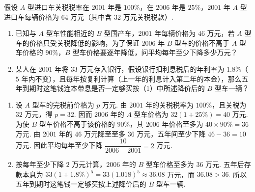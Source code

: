 \begin{problem}
假设 \(A\) 型进口车关税税率在 \(2001\text{ 年}\)是 \(100\%\)，在 \(2006\text{ 年}\)是 \(25\%\)，\(2001\text{ 年}\) \(A\) 型进口车每辆价格为 \(64\text{ 万元}\)（其中含 \(32\text{ 万元}\)关税税款）.
\begin{enumerate}
\item 已知与 \(A\) 型车性能相近的 \(B\) 型国产车，\(2001\text{ 年}\)每辆价格为 \(46\text{ 万元}\)，若 \(A\) 型车的价格只受关税降低的影响，为了保证 \(2006\text{ 年}\) \(B\) 型车的价格不高于 \(A\) 型车价格的 \(90\%\)，\(B\) 型车价格要逐年降低，问平均每年至少下降多少万元？
\item 某人在 \(2001\text{ 年}\)将 \(33\text{ 万元}\)存入银行，假设银行扣利息税后的年利率为 \(1.8\%\)（\(5\text{ 年}\)内不变），且每年按复利计算（上一年的利息计入第二年的本金），那么五年到期时这笔钱连本带息是否一定够买按（1）中所述降价后的 \(B\) 型车一辆？
\end{enumerate}

\begin{solution}
\begin{enumerate}
\item 设 \(A\) 型车的完税前价格为 \(p\) 万元. 由 \(2001\text{ 年}\)的关税税率为 \(100\%\)，且关税为 \(32\text{ 万元}\)，得 \(p=32\). 因而 \(2006\text{ 年}\)的 \(A\) 型车价格为 \(32(1+25\%)=40\) 万元. 为使 \(B\) 型车价格不高于该价格的 \(90\%\)，其 \(2006\text{ 年}\)价格至多为 \(40\times90\%=36\) 万元. 由 \(2001\text{ 年}\)的 \(46\) 万元降至至多 \(36\) 万元，五年间至少下降 \(46-36=10\) 万元. 因此平均每年至少下降 \(\dfrac{10}{2006-2001}=2\) 万元.
\item 按每年至少下降 \(2\) 万元计算，\(2006\text{ 年}\)的 \(B\) 型车价格至多为 \(36\) 万元. 五年后存款本息为 \(33(1+1.8\%)^{5}=33(1.018)^{5}\approx36.08\) 万元，而 \(36.08>36\). 所以五年到期时这笔钱一定够买按上述降价后的 \(B\) 型车一辆.
\end{enumerate}
\end{solution}
\end{problem}

